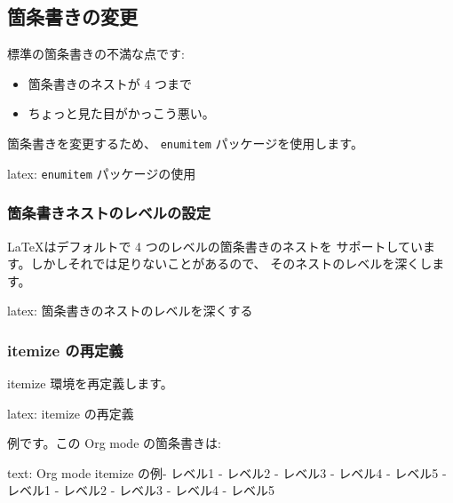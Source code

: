 \documentclass[dvipdfmx,a4j,14pt,uplatex]{jsarticle}
\begin{document}
\subsection{箇条書きの変更}
\label{sec:org99ddfac}
標準の箇条書きの不満な点です:

\begin{itemize}
\item 箇条書きのネストが 4 つまで
\item ちょっと見た目がかっこう悪い。
\end{itemize}

箇条書きを変更するため、 \texttt{enumitem} パッケージを使用します。

\begin{programlist}[label={org7744dce}]{latex}{: \texttt{enumitem} パッケージの使用}\usepackage{enumitem}
\end{programlist}


\subsubsection{箇条書きネストのレベルの設定}
\label{sec:orgf743e70}
\LaTeX はデフォルトで 4 つのレベルの箇条書きのネストを
サポートしています。しかしそれでは足りないことがあるので、
そのネストのレベルを深くします。

\begin{programlist}[label={org8b8561c}]{latex}{: 箇条書きのネストのレベルを深くする}
\end{programlist}

\subsubsection{itemize の再定義}
\label{sec:org0b526f1}
itemize 環境を再定義します。

\begin{programlist}[label={org6db231a}]{latex}{: itemize の再定義}
\end{programlist}

例です。この Org mode の箇条書きは:

\begin{programlist}[label={org205228d}]{text}{: Org mode itemize の例}- レベル1
  - レベル2
    - レベル3
      - レベル4
        - レベル5
- レベル1
  - レベル2
    - レベル3
      - レベル4
        - レベル5
\end{programlist}
\end{document}
